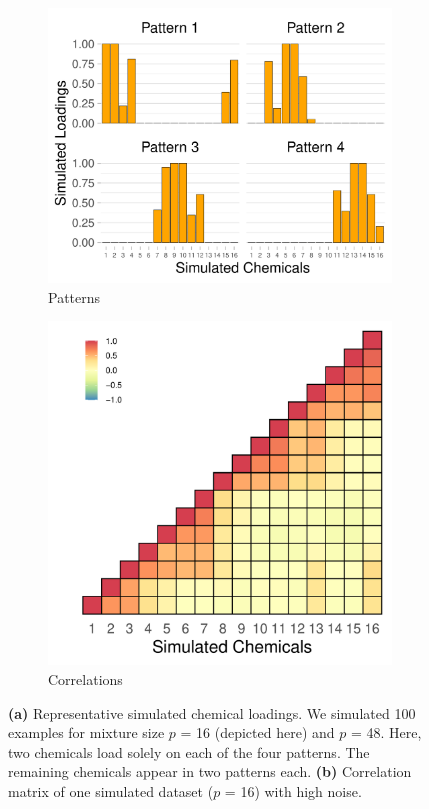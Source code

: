 \begin{landscape}
\begin{figure}
\centering
\begin{subfigure}[c]{0.7\textwidth}
\includegraphics[width=1\linewidth]{./figures/loadings_plot.pdf}
\caption{Patterns}
\label{fig:simpatterns}
\end{subfigure}
\hspace{-0.5em}
\begin{subfigure}[c]{0.6\textwidth}
\includegraphics[width=.95\linewidth]{./figures/sim_corr.pdf}
\caption{Correlations}
\label{fig:simcorr}
\end{subfigure}
\hfill
\caption{\textbf{(a)} Representative simulated chemical loadings. We simulated 100 examples for mixture size $p$ = 16 (depicted here) and $p$ = 48. Here, two chemicals load solely on each of the four patterns. The remaining chemicals appear in two patterns each. \textbf{(b)} Correlation matrix of one simulated dataset ($p$ = 16) with high noise.}
\end{figure}
\end{landscape}

